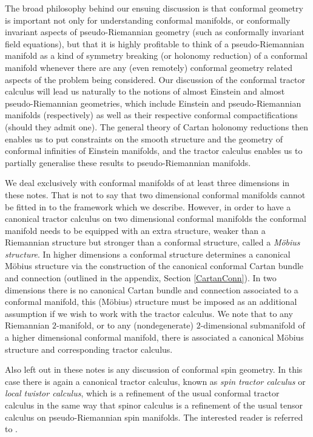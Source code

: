 \documentclass[a4paper,12pt]{amsart}
\theoremstyle{remark}
\begin{document}
The broad philosophy behind our ensuing discussion is that conformal geometry is important not only for understanding conformal manifolds, or conformally invariant aspects of pseudo-Riemannian geometry (such as conformally invariant field equations), but that it is highly profitable to think of a pseudo-Riemannian manifold as a kind of symmetry breaking (or holonomy reduction) of a conformal manifold whenever there are any (even remotely) conformal geometry related aspects of the problem being considered. Our discussion of the conformal tractor calculus will lead us naturally to the notions of almost Einstein and almost pseudo-Riemannian geometries, which include Einstein and pseudo-Riemannian manifolds (respectively) as well as their respective conformal compactifications (should they admit one). The general theory of Cartan holonomy reductions then enables us to put constraints on the smooth structure and the geometry of conformal infinities of Einstein manifolds, and the tractor calculus enables us to partially generalise these results to pseudo-Riemannian manifolds.

We deal exclusively with conformal manifolds of at least three
dimensions in these notes. That is not to say that two dimensional
conformal manifolds cannot be fitted in to the framework which we
describe. However, in order to have a canonical tractor calculus on
two dimensional conformal manifolds the conformal manifold needs to be
equipped with an extra structure, weaker than a Riemannian structure
but stronger than a conformal structure, called a \emph{M\"obius
  structure}. In higher dimensions a conformal structure determines a
canonical M\"obius structure via the construction of the canonical
conformal Cartan bundle and connection (outlined in the appendix,
Section \ref{CartanConn}). In two dimensions there is no canonical
Cartan bundle and connection associated to a conformal manifold, this
(M\"obius) structure must be imposed as an additional assumption if we
wish to work with the tractor calculus. We note that to any Riemannian
$2$-manifold, or to any (nondegenerate) $2$-dimensional submanifold of
a higher dimensional conformal manifold, there is associated a
canonical M\"obius structure and corresponding tractor calculus.

Also left out in these notes is any discussion of conformal spin geometry. In this case there is again a canonical tractor calculus, known as \emph{spin tractor calculus} or \emph{local twistor calculus}, which is a refinement of the usual conformal tractor calculus in the same way that spinor calculus is a refinement of the usual tensor calculus on pseudo-Riemannian spin manifolds. The interested reader is referred to \cite{Branson-ConfSpin,PenroseMacCallum}.
\end{document}
